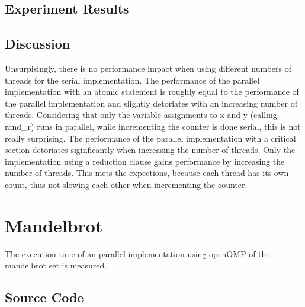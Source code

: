 \documentclass[parskip]{scrartcl}
\begin{document}
	\subsection{Experiment Results}

	\subsection{Discussion}
	Unsurpisingly, there is no performance impact when using different numbers of threads for the serial implementation. The performance of the parallel implementation with an atomic statement is roughly equal to the performance of the parallel implementation and slightly detoriates with an increasing number of threads. Considering that only  the variable assignments to x and y (calling rand\_r) runs in parallel, while incrementing the counter is done serial, this is not really surprising. The performance of the parallel implementation with a critical section detoriates siginficantly when increasing the number of threads. Only the implementation using a reduction clause gains performance by increasing the number of threads. This mets the expections, because each thread has its own count, thus not slowing each other when incrementing the counter.
	
	\section{Mandelbrot}
	
	The execution time of an parallel implementation using openOMP of the mandelbrot set is measured.
	
	\subsection{Source Code}
	\inputminted	[linenos]{c}{ex2/mandelbrot.c}
	
\end{document}

